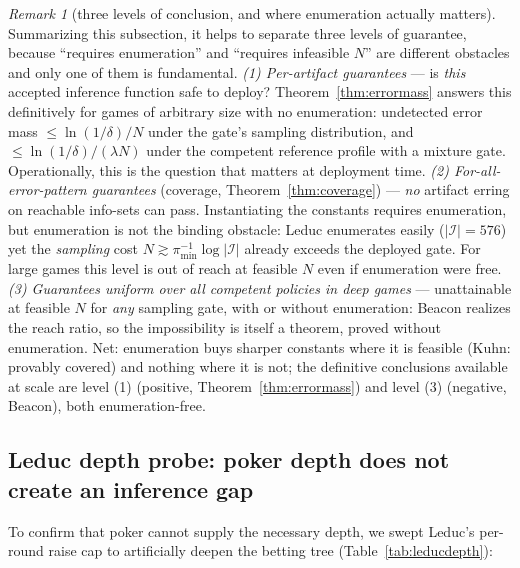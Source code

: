 \documentclass[11pt]{article}
\theoremstyle{remark}
\newtheorem{remark}{Remark}
\newcommand{\Ireach}{\mathcal{I}}
\begin{document}
\begin{remark}[three levels of conclusion, and where enumeration actually matters]
\label{rem:threelevels}
Summarizing this subsection, it helps to separate three levels of guarantee, because ``requires enumeration'' and ``requires infeasible $N$'' are different obstacles and only one of them is fundamental. \emph{(1) Per-artifact guarantees} --- is \emph{this} accepted inference function safe to deploy? Theorem~\ref{thm:errormass} answers this definitively for games of arbitrary size with no enumeration: undetected error mass $\leq \ln(1/\delta)/N$ under the gate's sampling distribution, and $\leq \ln(1/\delta)/(\lambda N)$ under the competent reference profile with a mixture gate. Operationally, this is the question that matters at deployment time. \emph{(2) For-all-error-pattern guarantees} (coverage, Theorem~\ref{thm:coverage}) --- \emph{no} artifact erring on reachable info-sets can pass. Instantiating the constants requires enumeration, but enumeration is not the binding obstacle: Leduc enumerates easily ($|\Ireach| = 576$) yet the \emph{sampling} cost $N \gtrsim \pi_{\min}^{-1} \log|\Ireach|$ already exceeds the deployed gate. For large games this level is out of reach at feasible $N$ even if enumeration were free. \emph{(3) Guarantees uniform over all competent policies in deep games} --- unattainable at feasible $N$ for \emph{any} sampling gate, with or without enumeration: Beacon realizes the reach ratio, so the impossibility is itself a theorem, proved without enumeration. Net: enumeration buys sharper constants where it is feasible (Kuhn: provably covered) and nothing where it is not; the definitive conclusions available at scale are level (1) (positive, Theorem~\ref{thm:errormass}) and level (3) (negative, Beacon), both enumeration-free.
\end{remark}

\subsection{Leduc depth probe: poker depth does not create an inference gap}

To confirm that poker cannot supply the necessary depth, we swept Leduc's per-round raise cap to artificially deepen the betting tree (Table~\ref{tab:leducdepth}):

\begin{table}[ht]
\centering
\small
{}
\caption{Leduc depth probe.}
\label{tab:leducdepth}
\end{table}
\end{document}
